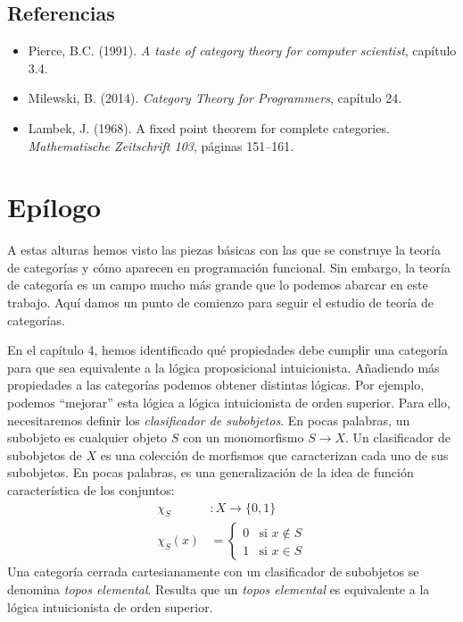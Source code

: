\documentclass[12pt, twoside]{book}
\newcommand{\newterm}[1]{\index{#1}\emph{#1}}
\begin{document}
\section{Referencias}
\begin{itemize}
  \item Pierce, B.C. (1991). \emph{A taste of category theory for computer scientist}, capítulo 3.4.
  \item Milewski, B. (2014). \emph{Category Theory for Programmers}, capítulo 24.
  \item Lambek, J. (1968). A fixed point theorem for complete categories. \emph{Mathematische Zeitschrift 103}, páginas 151--161. \label{lambek-pf}
\end{itemize}

\chapter*{Epílogo}

A estas alturas hemos visto las piezas básicas con las que se construye la teoría de categorías y cómo aparecen en programación funcional.
Sin embargo, la teoría de categoría es un campo mucho más grande que lo podemos abarcar en este trabajo.
Aquí damos un punto de comienzo para seguir el estudio de teoría de categorías.

En el capítulo 4, hemos identificado qué propiedades debe cumplir una categoría para que sea equivalente a la lógica proposicional intuicionista.
Añadiendo más propiedades a las categorías podemos obtener distintas lógicas.
Por ejemplo, podemos ``mejorar'' esta lógica a lógica intuicionista de orden superior.
Para ello, necesitaremos definir los \emph{clasificador de subobjetos}.
En pocas palabras, un subobjeto es cualquier objeto $S$ con un monomorfismo $S \to X$.
Un clasificador de subobjetos de $X$ es una colección de morfismos que caracterizan cada uno de sus subobjetos.
En pocas palabras, es una generalización de la idea de función característica de los conjuntos:
\begin{align*}
\chi_S & \colon X \to \{0,1\}\\
\chi_S (x) & = \begin{cases}0 & \text{si }x \notin S\\1 & \text{si }x \in S\end{cases}
\end{align*}
Una categoría cerrada cartesianamente con un clasificador de subobjetos se denomina \newterm{topos elemental}.
Resulta que un \newterm{topos elemental} es equivalente a la lógica intuicionista de orden superior.
\end{document}
